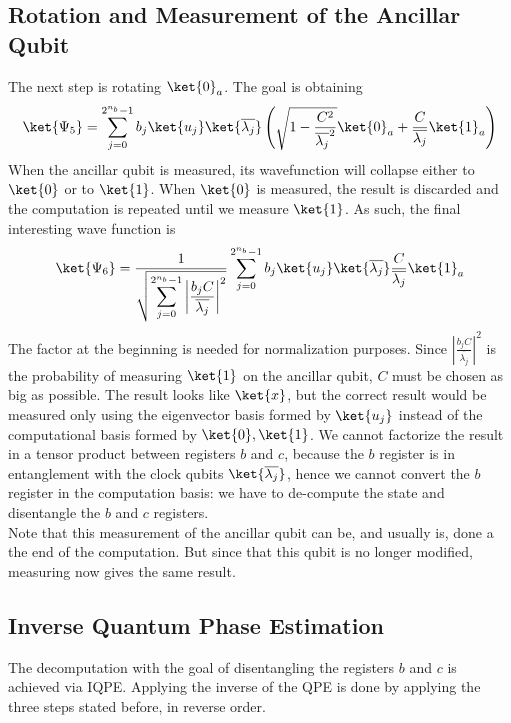 \documentclass[10pt]{article}
\begin{document}
\subsection{Rotation and Measurement of the Ancillar Qubit}
The next step is rotating $\ket{0}_a$. The goal is obtaining
$$\ket{\Psi_5}=\sum_{j=0}^{2^{n_b}-1}b_j\ket{u_j}\ket{\overline{\lambda_j}}\left(\sqrt{1-\frac{C^2}{\overline{\lambda_j}^2}}\ket{0}_a+\frac{C}{\overline{\lambda_j}}\ket{1}_a\right)$$
When the ancillar qubit is measured, its wavefunction will collapse either to $\ket{0}$ or to $\ket{1}$. When $\ket{0}$ is measured, the result is discarded and the computation is repeated until we measure $\ket{1}$. As such, the final interesting wave function is
$$\ket{\Psi_6}=\frac{\displaystyle 1}{\displaystyle \sqrt{\sum_{j=0}^{2^{n_b}-1}\left|\frac{b_jC}{\overline{\lambda_j}}\right|^2}}\sum_{j=0}^{2^{n_b}-1}b_j\ket{u_j}\ket{\overline{\lambda_j}}\frac{C}{\overline{\lambda_j}}\ket{1}_a$$
The factor at the beginning is needed for normalization purposes. Since $|\frac{b_jC}{\overline{\lambda_j}}|^2$ is the probability of measuring $\ket{1}$ on the ancillar qubit, $C$ must be chosen as big as possible. The result looks like $\ket{x}$, but the correct result would be measured only using the eigenvector basis formed by $\ket{u_j}$ instead of the computational basis formed by $\ket{0},\ket{1}$. We cannot factorize the result in a tensor product between registers $b$ and $c$, because the $b$ register is in entanglement with the clock qubits $\ket{\overline{\lambda_j}}$, hence we cannot convert the $b$ register in the computation basis: we have to de-compute the state and disentangle the $b$ and $c$ registers.\\
Note that this measurement of the ancillar qubit can be, and usually is, done a the end of the computation. But since that this qubit is no longer modified, measuring now gives the same result.
\subsection{Inverse Quantum Phase Estimation}
The decomputation with the goal of disentangling the registers $b$ and $c$ is achieved via IQPE. Applying the inverse of the QPE is done by applying the three steps stated before, in reverse order.
\end{document}
